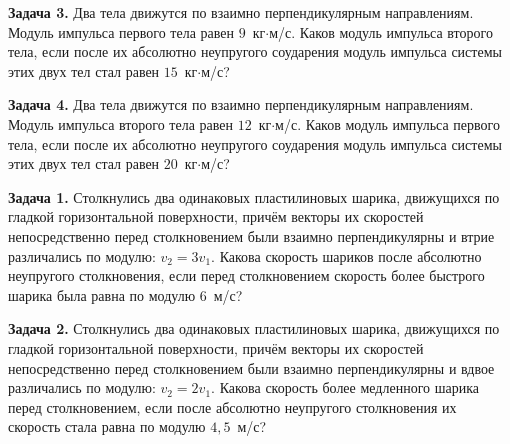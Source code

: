 \begin{taskbasic}[code={\label{task:momentum_v27_n3}}]
\textbf{Задача 3.} Два тела движутся по взаимно перпендикулярным направлениям. Модуль импульса первого тела равен $9$~кг$\cdot$м/с. Каков модуль импульса второго тела, если после их абсолютно неупругого соударения модуль импульса системы этих двух тел стал равен $15$~кг$\cdot$м/с?

\end{taskbasic}

\begin{taskbasic}[code={\label{task:momentum_v28_n3}}]
\textbf{Задача 4.} Два тела движутся по взаимно перпендикулярным направлениям. Модуль импульса второго тела равен $12$~кг$\cdot$м/с. Каков модуль импульса первого тела, если после их абсолютно неупругого соударения модуль импульса системы этих двух тел стал равен $20$~кг$\cdot$м/с?

\end{taskbasic}


\begin{taskbasic}[code={\label{task:momentum_v1_n22}}]
\textbf{Задача 1.} Столкнулись два одинаковых пластилиновых шарика, движущихся по гладкой горизонтальной поверхности, причём векторы их скоростей непосредственно перед столкновением были взаимно перпендикулярны и втрие различались по модулю: $v_2 = 3v_1$. Какова скорость шариков после абсолютно неупругого столкновения, если перед столкновением скорость более быстрого шарика была равна по модулю $6$~м/с?

\end{taskbasic}

\begin{taskbasic}[code={\label{task:momentum_v2_n22}}]
\textbf{Задача 2.} Столкнулись два одинаковых пластилиновых шарика, движущихся по гладкой горизонтальной поверхности, причём векторы их скоростей непосредственно перед столкновением были взаимно перпендикулярны и вдвое различались по модулю: $v_2 = 2v_1$. Какова скорость более медленного шарика перед столкновением, если после абсолютно неупругого столкновения их скорость стала равна по модулю $4{,}5$~м/с?

\end{taskbasic}

